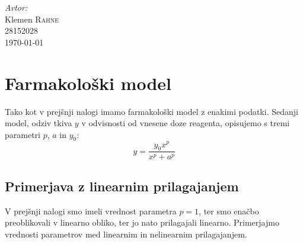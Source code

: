 \documentclass[slovene,11pt,a4paper]{article}
\numberwithin{equation}{section} %
\numberwithin{figure}{section} %
\numberwithin{table}{section} %
\begin{document}
\begin{titlepage}



\Large \emph{Avtor:}\\
Klemen \textsc{Rahne}\\
28152028\\[2cm]

{\large \today } \\[0.5cm] %

	

\end{titlepage}





\section{Farmakološki model}
Tako kot v prejšnji nalogi imamo farmakološki model z enakimi podatki. Sedanji model, odziv tkiva $y$ v odvisnosti od vnesene doze reagenta, opisujemo s tremi parametri $p$, $a$ in $y_0$:
\begin{equation}
\label{farmacevti-1}
y=\frac{y_0 x^p}{x^p+a^p}
\end{equation}
\subsection{Primerjava z linearnim prilagajanjem}
V prejšnji nalogi smo imeli vrednost parametra $p=1$, ter smo enačbo preoblikovali v linearno obliko, ter jo nato prilagajali linearno. Primerjajmo vrednosti parametrov med linearnim in nelinearnim prilagajanjem.
\end{document}
